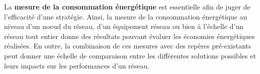 

La \textbf{mesure de la consommation énergétique} est essentielle afin de juger
de l'efficacité d'une stratégie. Ainsi, la mesure de la consommation
énergétique au niveau d'un noeud du réseau, d'un équipement réseau ou bien à
l'échelle d'un réseau tout entier donne des résultats pouvant évaluer les
économies énergétiques réalisées.  En outre, la combinaison de ces mesures avec
des repères pré-existants peut donner une échelle de comparaison entre les
différentes solutions possibles et leurs impacts sur les performances d'un
réseau.
